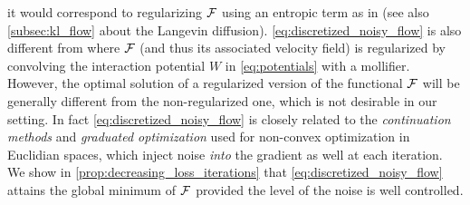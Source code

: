 it would correspond to regularizing ${{\mathcal F}}$ using an entropic term as in \cite{mei2018mean,Simsekli:2018} (see also \cref{subsec:kl_flow} about the Langevin diffusion). \cref{eq:discretized_noisy_flow} is also different from \cite{craig2016blob,carrillo2019blob} where ${{\mathcal F}}$ (and thus its associated velocity field) is regularized by convolving the interaction potential $W$ in \cref{eq:potentials} with a mollifier. However, the optimal solution of a regularized version of the functional ${{\mathcal F}}$ will be generally different from the non-regularized one, which is not desirable in our setting. 
In fact \cref{eq:discretized_noisy_flow} is  closely related to the \textit{continuation methods} \cite{Gulcehre:2016a,Gulcehre:2016,Chaudhari:2017}  and \textit{graduated optimization} \cite{Hazan:2015} used for non-convex optimization in Euclidian spaces, which inject noise \textit{into} the gradient as well at each iteration. %
We show in \cref{prop:decreasing_loss_iterations} that \cref{eq:discretized_noisy_flow} attains the global minimum of ${{\mathcal F}}$ provided the level of the noise is well controlled. %

